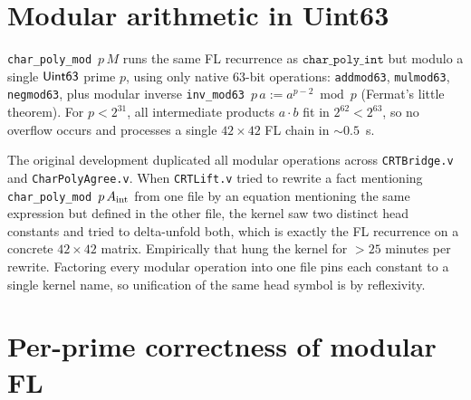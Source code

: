 \section{Modular arithmetic in Uint63}

\begin{definition}\label{def:char_poly_mod}
\rocqok
{}
\texttt{char\_poly\_mod}~$p\,M$ runs the same FL recurrence as
$\texttt{char\_poly\_int}$ but modulo a single $\mathsf{Uint63}$ prime $p$,
using only native 63-bit operations: \texttt{addmod63},
\texttt{mulmod63}, \texttt{negmod63}, plus modular inverse
\texttt{inv\_mod63}~$p\,a := a^{p - 2} \bmod p$ (Fermat's little
theorem). For $p < 2^{31}$, all intermediate products $a \cdot b$ fit
in $2^{62} < 2^{63}$, so no overflow occurs and \vmcompute{}
processes a single $42 \times 42$ FL chain in ${\sim}0.5$~s.
\end{definition}

\begin{remark}
\label{rem:modular_arith_factor}
The original development duplicated all modular operations across
\texttt{CRTBridge.v} and \texttt{CharPolyAgree.v}. When
\texttt{CRTLift.v} tried to rewrite a fact mentioning
\texttt{char\_poly\_mod}~$p\,A_{\mathrm{int}}$ from one file by an equation
mentioning the same expression but defined in the other file, the
kernel saw two distinct head constants and tried to delta-unfold both,
which is exactly the FL recurrence on a concrete $42 \times 42$
matrix. Empirically that hung the kernel for $> 25$ minutes per
rewrite. Factoring every modular operation into one file pins each
constant to a single kernel name, so unification of the same head
symbol is by reflexivity.
\end{remark}

\section{Per-prime correctness of modular FL}

